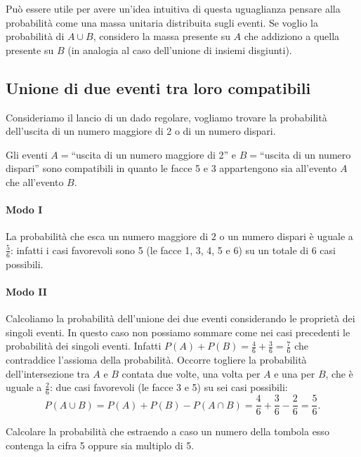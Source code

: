 Può essere utile per avere un'idea intuitiva di questa uguaglianza pensare alla probabilità come una massa unitaria distribuita sugli eventi. Se voglio la probabilità di $A\cup B$, considero la massa presente su $A$ che addiziono a quella presente su $B$ (in analogia al caso dell'unione di insiemi disgiunti).

\subsection{Unione di due eventi tra loro compatibili}

\begin{exrig}
\begin{esempio}
Consideriamo il lancio di un dado regolare, vogliamo trovare la probabilità dell'uscita di un numero maggiore di 2 o di un numero dispari.

Gli eventi $A=$``uscita di un numero maggiore di 2'' e $B=$``uscita di un numero dispari'' sono compatibili in quanto le facce 5 e 3 appartengono sia all'evento $A$ che all'evento $B$.
\begin{center}
 
\end{center}
\paragraph{Modo I} La probabilità che esca un numero maggiore di $2$ o un numero dispari è uguale a~$\frac 5 6$: infatti i casi favorevoli sono 5 (le facce 1, 3, 4, 5 e 6) su un totale di $6$ casi possibili.
\paragraph{Modo II} Calcoliamo la probabilità dell'unione dei due eventi considerando le proprietà dei singoli eventi. In questo caso non possiamo sommare come nei casi precedenti le probabilità dei singoli eventi. Infatti $P(A)+P(B)=\frac 4 6+\frac 3 6=\frac 7 6$ che contraddice l'assioma della probabilità. Occorre togliere la probabilità dell'intersezione tra $A$ e $B$ contata due volte, una volta per $A$ e una per $B$, che è uguale a $\frac 2 6$: due casi favorevoli (le facce 3 e 5) su sei casi possibili: \[P(A\cup B)=P(A)+P(B)-P(A\cap B)=\frac 4 6+\frac 3 6-\frac 2 6=\frac 5 6.\]
\end{esempio}

\begin{esempio}
Calcolare la probabilità che estraendo a caso un numero della tombola esso contenga la cifra 5 oppure sia multiplo di 5.


\end{esempio}
\end{exrig}
